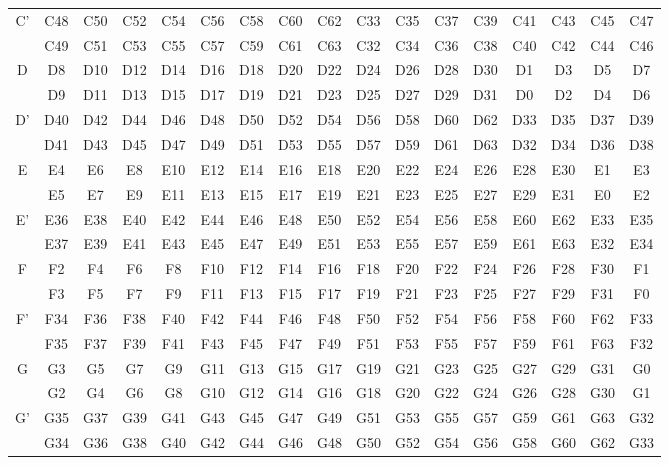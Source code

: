 \documentclass[journal,comsoc]{IEEEtran}
\begin{document}
\begin{small}
\begin{table}[t!]
\begin{threeparttable}
\begin{tabular}{|c||cccccccccccccccc|}
			\hline
			\multirow{2}{*}{C'} & C48 & C50 & C52 & C54 & C56 & C58 & C60 & C62 & C33 & C35 & C37 & C39 & C41 & C43 & C45 & C47 \\  
			& C49 & C51 & C53 & C55 & C57 & C59 & C61 & C63 & C32 & C34 & C36 & C38 & C40 & C42 & C44 & C46 \\  
			\hline
			\multirow{2}{*}{D} & D8 & D10 & D12 & D14 & D16 & D18 & D20 & D22 & D24 & D26 & D28 & D30 & D1 & D3 & D5 & D7 \\  
			& D9 & D11 & D13 & D15 & D17 & D19 & D21 & D23 & D25 & D27 & D29 & D31 & D0 & D2 & D4 & D6 \\  
			\hline
			\multirow{2}{*}{D'} & D40 & D42 & D44 & D46 & D48 & D50 & D52 & D54 & D56 & D58 & D60 & D62 & D33 & D35 & D37 & D39 \\  
			& D41 & D43 & D45 & D47 & D49 & D51 & D53 & D55 & D57 & D59 & D61 & D63 & D32 & D34 & D36 & D38 \\  
			\hline
			\multirow{2}{*}{E} & E4 & E6 & E8 & E10 & E12 & E14 & E16 & E18 & E20 & E22 & E24 & E26 & E28 & E30 & E1 & E3 \\  
			& E5 & E7 & E9 & E11 & E13 & E15 & E17 & E19 & E21 & E23 & E25 & E27 & E29 & E31 & E0 & E2 \\  
			\hline
			\multirow{2}{*}{E'} & E36 & E38 & E40 & E42 & E44 & E46 & E48 & E50 & E52 & E54 & E56 & E58 & E60 & E62 & E33 & E35 \\  
			& E37 & E39 & E41 & E43 & E45 & E47 & E49 & E51 & E53 & E55 & E57 & E59 & E61 & E63 & E32 & E34 \\  
			\hline
			\multirow{2}{*}{F} & F2 & F4 & F6 & F8 & F10 & F12 & F14 & F16 & F18 & F20 & F22 & F24 & F26 & F28 & F30 & F1 \\  
			& F3 & F5 & F7 & F9 & F11 & F13 & F15 & F17 & F19 & F21 & F23 & F25 & F27 & F29 & F31 & F0 \\  
			\hline
			\multirow{2}{*}{F'} & F34 & F36 & F38 & F40 & F42 & F44 & F46 & F48 & F50 & F52 & F54 & F56 & F58 & F60 & F62 & F33 \\  
			& F35 & F37 & F39 & F41 & F43 & F45 & F47 & F49 & F51 & F53 & F55 & F57 & F59 & F61 & F63 & F32 \\  
			\hline
			\multirow{2}{*}{G} & G3 & G5 & G7 & G9 & G11 & G13 & G15 & G17 & G19 & G21 & G23 & G25 & G27 & G29 & G31 & G0 \\  
			& G2 & G4 & G6 & G8 & G10 & G12 & G14 & G16 & G18 & G20 & G22 & G24 & G26 & G28 & G30 & G1 \\  
			\hline
			\multirow{2}{*}{G'} & G35 & G37 & G39 & G41 & G43 & G45 & G47 & G49 & G51 & G53 & G55 & G57 & G59 & G61 & G63 & G32 \\  
			& G34 & G36 & G38 & G40 & G42 & G44 & G46 & G48 & G50 & G52 & G54 & G56 & G58 & G60 & G62 & G33 \\
			\hline
		\end{tabular}
	\end{threeparttable}
\end{table}
\end{small}
\end{document}
